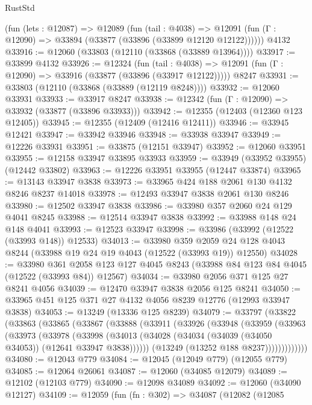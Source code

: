 \begin{lexlean}{RustStd}
\begin{coremodule}
    (fun (lets : @12087) =>
    @12089
      (fun (tail : @4038) =>
      @12091 (fun (Γ : @12090) => @33894 (@33877 (@33896 (@33899 @12120 @12122))))))
    @4132
@33916 := @12060 (@33803 (@12110 (@33868 (@33889 @13964))))
@33917 := @33899 @4132
@33926 := @12324
    (fun (tail : @4038) => @12091 (fun (Γ : @12090) => @33916 (@33877 (@33896 (@33917 @12122)))))
    @8247
@33931 := @33803 (@12110 (@33868 (@33889 (@12119 @8248))))
@33932 := @12060 @33931
@33933 := @33917 @8247
@33938 := @12342 (fun (Γ : @12090) => @33932 (@33877 (@33896 @33933)))
@33942 := @12355 (@12403 (@12360 @123 @12405))
@33945 := @12355 (@12409 (@12416 @12411))
@33946 := @33945 @12421
@33947 := @33942 @33946
@33948 := @33938 @33947
@33949 := @12226 @33931
@33951 := @33875 (@12151 @33947)
@33952 := @12060 @33951
@33955 := @12158 @33947 @33895 @33933
@33959 := @33949 (@33952 @33955) (@12442 @33802)
@33963 := @12226 @33951 @33955 (@12447 @33874)
@33965 := @13143 @33947 @3838
@33973 := @33965 @424 @188 @2061 @130 @4132 @8246 @8237 @14018
@33978 := @12493 @33947 @3838 @2061 @130 @8246
@33980 := @12502 @33947 @3838
@33986 := @33980 @357 @2060 @24 @129 @4041 @8245
@33988 := @12514 @33947 @3838
@33992 := @33988 @148 @24 @148 @4041
@33993 := @12523 @33947
@33998 := @33986 (@33992 (@12522 (@33993 @148)) @12533)
@34013 := @33980
    @359
    @2059
    @24
    @128
    @4043
    @8244
    (@33988 @19 @24 @19 @4043 (@12522 (@33993 @19)) @12550)
@34028 := @33980
    @361
    @2058
    @123
    @127
    @4045
    @8243
    (@33988 @84 @123 @84 @4045 (@12522 (@33993 @84)) @12567)
@34034 := @33980 @2056 @371 @125 @27 @8241 @4056
@34039 := @12470 @33947 @3838 @2056 @125 @8241
@34050 := @33965 @451 @125 @371 @27 @4132 @4056 @8239 @12776 (@12993 @33947 @3838)
@34053 := @13249 (@13336 @125 @8239)
@34079 := @33797
    (@33822
      (@33863
        (@33865
          (@33867
            (@33888
              (@33911
                (@33926
                  (@33948
                    (@33959
                      (@33963
                        (@33973
                          (@33978
                            (@33998
                              (@34013
                                (@34028 (@34034 (@34039 (@34050 @34053)) (@12641 @33947 @3838))))))
                          (@13249 (@13252 @188 @8237)))))))))))))
@34080 := @12043 @779
@34084 := @12045 (@12049 @779) (@12055 @779)
@34085 := @12064 @26061
@34087 := @12060 (@34085 @12079)
@34089 := @12102 (@12103 @779)
@34090 := @12098 @34089
@34092 := @12060 (@34090 @12127)
@34109 := @12059
    (fun (fn : @302) =>
    @34087
      (@12082
        (@12085

\end{coremodule}
\end{lexlean}
